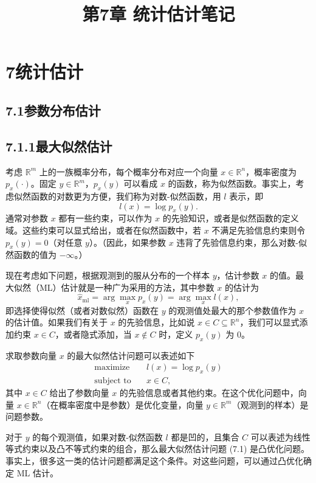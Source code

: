 \documentclass[UTF8,12pt,a4paper,fontset=fandol]{ctexart}
\title{第7章 统计估计笔记}
\author{}
\date{}
\begin{document}
\maketitle

\section*{7\quad 统计估计}

\subsection*{7.1\quad 参数分布估计}

\subsection*{7.1.1\quad 最大似然估计}

考虑 $\mathbb{R}^m$ 上的一族概率分布，每个概率分布对应一个向量 $x\in\mathbb{R}^n$，概率密度为 $p_x(\cdot)$。固定 $y\in\mathbb{R}^m$，$p_x(y)$ 可以看成 $x$ 的函数，称为似然函数。事实上，考虑似然函数的对数更为方便，我们称为对数-似然函数，用 $l$ 表示，即
\[
l(x)=\log p_x(y).
\]
通常对参数 $x$ 都有一些约束，可以作为 $x$ 的先验知识，或者是似然函数的定义域。这些约束可以显式给出，或者在似然函数中，若 $x$ 不满足先验信息约束则令 $p_x(y)=0$（对任意 $y$）。（因此，如果参数 $x$ 违背了先验信息约束，那么对数-似然函数的值为 $-\infty$。）

现在考虑如下问题，根据观测到的服从分布的一个样本 $y$，估计参数 $x$ 的值。最大似然（ML）估计就是一种广为采用的方法，其中参数 $x$ 的估计为
\[
\hat{x}_{\mathrm{ml}}=\arg\max_x p_x(y)=\arg\max_x l(x),
\]
即选择使得似然（或者对数似然）函数在 $y$ 的观测值处最大的那个参数值作为 $x$ 的估计值。如果我们有关于 $x$ 的先验信息，比如说 $x\in C\subseteq\mathbb{R}^n$，我们可以显式添加约束 $x\in C$，或者隐式添加，当 $x\notin C$ 时，定义 $p_x(y)$ 为 $0$。

求取参数向量 $x$ 的最大似然估计问题可以表述如下
\begin{equation}
\begin{aligned}
\text{maximize}\quad & l(x)=\log p_x(y)\\
\text{subject to}\quad & x\in C,
\end{aligned}
\tag{7.1}
\end{equation}
其中 $x\in C$ 给出了参数向量 $x$ 的先验信息或者其他约束。在这个优化问题中，向量 $x\in\mathbb{R}^n$（在概率密度中是参数）是优化变量，向量 $y\in\mathbb{R}^m$（观测到的样本）是问题参数。

对于 $y$ 的每个观测值，如果对数-似然函数 $l$ 都是凹的，且集合 $C$ 可以表述为线性等式约束以及凸不等式约束的组合，那么最大似然估计问题 (7.1) 是凸优化问题。事实上，很多这一类的估计问题都满足这个条件。对这些问题，可以通过凸优化确定 ML 估计。
\end{document}

